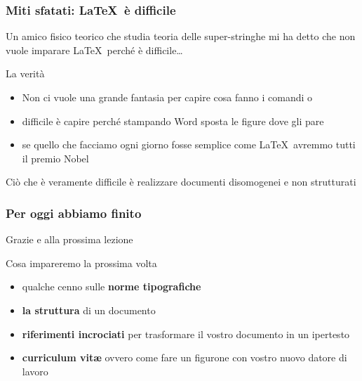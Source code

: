 \documentclass[svgnames,%
	ucs,%
	pdftex]{guitbeamer}
\begin{document}
\begin{frame}
  \frametitle{Miti sfatati: \LaTeX\ \`e difficile} 
	Un amico fisico teorico che studia teoria delle super-stringhe mi ha detto che non vuole imparare \LaTeX\ perch\'e \`e difficile\dots
  \medskip
	\begin{block}{La verit\`a}
		\begin{itemize}
			\item Non ci vuole una grande fantasia per capire cosa fanno i comandi  o 
			\item difficile \`e capire perch\'e stampando Word sposta le figure dove gli pare
			\item se quello che facciamo ogni giorno fosse semplice come \LaTeX\ avremmo tutti il premio Nobel
		\end{itemize}
	\end{block}
  \smallskip
	\begin{block}{}
		Ci\`o che \`e veramente difficile \`e realizzare documenti disomogenei e non strutturati
	\end{block}
\end{frame}

\begin{frame}
  \frametitle{Per oggi abbiamo finito}
	\begin{center}
	  \huge
		Grazie e alla prossima lezione
	\end{center}
  \medskip
	\begin{block}{Cosa impareremo la prossima volta}
		\begin{itemize}
			\item qualche cenno sulle \textbf{norme tipografiche} 
			\item \textbf{la struttura} di un documento
			\item \textbf{riferimenti incrociati} per trasformare il vostro documento in un ipertesto
			\item \textbf{curriculum vit\ae} ovvero come fare un figurone con vostro nuovo datore di lavoro
		\end{itemize}
	\end{block}
\end{frame}
\end{document}
